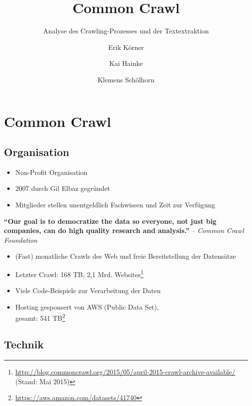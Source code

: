 \documentclass[a4paper,12pt,titlepage=false]{scrreprt}
\title{\vspace{3cm}Common Crawl}
\subtitle{Analyse des Crawling-Prozesses und der Textextraktion}
\author{Erik Körner \and Kai Hainke \and Klemens Schölhorn}
\begin{document}
\maketitle
\vspace{2cm}
\tableofcontents

\onehalfspacing

\chapter{Common Crawl}

\section{Organisation}

\begin{itemize}
    \item Non-Profit Organisation
    \item 2007 durch Gil Elbaz gegründet
    \item Mitglieder stellen unentgeldlich Fachwissen und Zeit zur Verfügung
\end{itemize}
\textbf{``Our goal is to democratize the data so everyone, not just big companies, can do high quality research and analysis.''}
\hfill-- \textit{Common Crawl Foundation}

\begin{itemize}
    \item (Fast) monatliche Crawls des Web und freie Bereitstellung der Datensätze
    \item Letzter Crawl: 168 TB, 2,1 Mrd. Websites\footnote{\url{http://blog.commoncrawl.org/2015/05/april-2015-crawl-archive-available/} (Stand: Mai 2015)}
    \item Viele Code-Beispiele zur Verarbeitung der Daten
    \item Hosting gesponsert von AWS (Public Data Set),\\gesamt: 541 TB\footnote{\url{https://aws.amazon.com/datasets/41740}}
\end{itemize}


\section{Technik}
\end{document}
